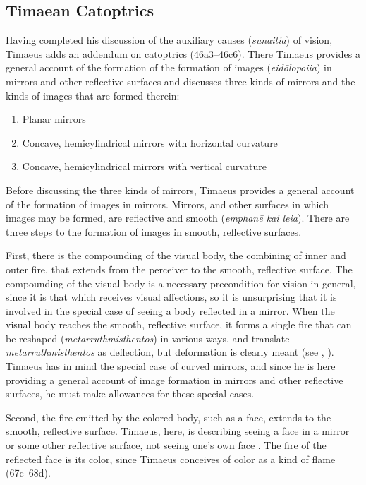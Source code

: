 
\subsection{Timaean Catoptrics} %
\label{sub:timaen_catoptrics}

Having completed his discussion of the auxiliary causes (\emph{sunaitia}) of vision, Timaeus adds an addendum on catoptrics (46a3–46c6). There Timaeus provides a general account of the formation of the formation of images (\emph{eidōlopoiia}) in mirrors and other reflective surfaces and discusses three kinds of mirrors and the kinds of images that are formed therein:
\begin{enumerate}
	\item Planar mirrors
	\item Concave, hemicylindrical mirrors with horizontal curvature
	\item Concave, hemicylindrical mirrors with vertical curvature
\end{enumerate}

Before discussing the three kinds of mirrors, Timaeus provides a general account of the formation of images in mirrors. Mirrors, and other surfaces in which images may be formed, are reflective and smooth (\emph{emphanē kai leia}). There are three steps to the formation of images in smooth, reflective surfaces. 

First, there is the compounding of the visual body, the combining of inner and outer fire, that extends from the perceiver to the smooth, reflective surface. The compounding of the visual body is a necessary precondition for vision in general, since it is that which receives visual affections, so it is unsurprising that it is involved in the special case of seeing a body reflected in a mirror. When the visual body reaches the smooth, reflective surface, it forms a single fire that can be reshaped (\emph{metarruthmisthentos}) in various ways. \citet[159]{Archer-Hind:1888qd} and \citet[103]{Bury:1929jb} translate \emph{metarruthmisthentos} as deflection, but deformation is clearly meant (see \citealt[287]{Taylor:1928qb}, \citealt[154]{Cornford:1935fk}). Timaeus has in mind the special case of curved mirrors, and since he is here providing a general account of image formation in mirrors and other reflective surfaces, he must make allowances for these special cases. 

Second, the fire emitted by the colored body, such as a face, extends to the smooth, reflective surface. Timaeus, here, is describing seeing a face in a mirror or some other reflective surface, not seeing one's own face \citep[286--7]{Taylor:1928qb}. The fire of the reflected face is its color, since Timaeus conceives of color as a kind of flame (67c–68d). 

